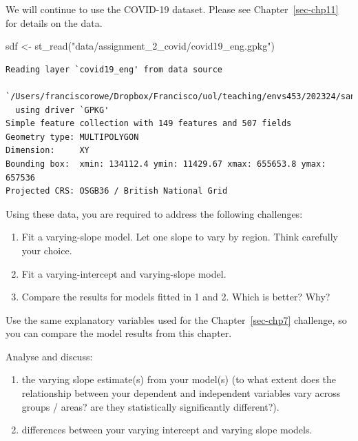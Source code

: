 \documentclass[
  letterpaper,
  DIV=11,
  numbers=noendperiod,
  oneside]{scrreprt}
\newenvironment{Shaded}{\begin{snugshade}}{\end{snugshade}}
\newcommand{\FunctionTok}[1]{\textcolor[rgb]{0.28,0.35,0.67}{#1}}
\newcommand{\NormalTok}[1]{\textcolor[rgb]{0.00,0.23,0.31}{#1}}
\newcommand{\OtherTok}[1]{\textcolor[rgb]{0.00,0.23,0.31}{#1}}
\newcommand{\StringTok}[1]{\textcolor[rgb]{0.13,0.47,0.30}{#1}}
\providecommand{\tightlist}{%
  \setlength{\itemsep}{0pt}\setlength{\parskip}{0pt}}\usepackage{longtable,booktabs,array}
\begin{document}
We will continue to use the COVID-19 dataset. Please see
Chapter~\ref{sec-chp11} for details on the data.

\begin{Shaded}
\begin{Highlighting}[]
\NormalTok{sdf }\OtherTok{\textless{}{-}} \FunctionTok{st\_read}\NormalTok{(}\StringTok{"data/assignment\_2\_covid/covid19\_eng.gpkg"}\NormalTok{)}
\end{Highlighting}
\end{Shaded}

\begin{verbatim}
Reading layer `covid19_eng' from data source 
  `/Users/franciscorowe/Dropbox/Francisco/uol/teaching/envs453/202324/san/data/assignment_2_covid/covid19_eng.gpkg' 
  using driver `GPKG'
Simple feature collection with 149 features and 507 fields
Geometry type: MULTIPOLYGON
Dimension:     XY
Bounding box:  xmin: 134112.4 ymin: 11429.67 xmax: 655653.8 ymax: 657536
Projected CRS: OSGB36 / British National Grid
\end{verbatim}

Using these data, you are required to address the following challenges:

\begin{enumerate}
\def\labelenumi{\arabic{enumi}.}
\item
  Fit a varying-slope model. Let one slope to vary by region. Think
  carefully your choice.
\item
  Fit a varying-intercept and varying-slope model.
\item
  Compare the results for models fitted in 1 and 2. Which is better?
  Why?
\end{enumerate}

Use the same explanatory variables used for the Chapter~\ref{sec-chp7}
challenge, so you can compare the model results from this chapter.

Analyse and discuss:

\begin{enumerate}
\def\labelenumi{\arabic{enumi}.}
\tightlist
\item
  the varying slope estimate(s) from your model(s) (to what extent does
  the relationship between your dependent and independent variables vary
  across groups / areas? are they statistically significantly
  different?).
\item
  differences between your varying intercept and varying slope models.
\end{enumerate}
\end{document}
